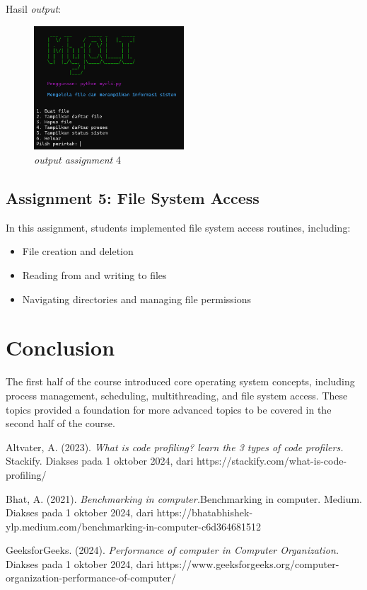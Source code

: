 \documentclass[12pt]{article}
\begin{document}
\par Hasil \textit{output}:
\begin{figure}[h]
    \centering
    \includegraphics[width=0.5\textwidth] {asset/output_assignment4_group2.png} 
    \caption{\textit{output assignment} 4}
    \label{fig:output_assignment_4}
\end{figure}

\subsection{Assignment 5: File System Access}
In this assignment, students implemented file system access routines, including:
\begin{itemize}
    \item File creation and deletion
    \item Reading from and writing to files
    \item Navigating directories and managing file permissions
\end{itemize}

\section{Conclusion}
The first half of the course introduced core operating system concepts, including process management, scheduling, multithreading, and file system access. These topics provided a foundation for more advanced topics to be covered in the second half of the course.

\begin{thebibliography}{3}
    Altvater, A. (2023). \textit{What is code profiling? learn the 3 types of code profilers.} Stackify. Diakses pada 1 oktober 2024, dari https://stackify.com/what-is-code-profiling/ 
    
    Bhat, A. (2021). \textit{Benchmarking in computer.}Benchmarking in computer. Medium. Diakses pada 1 oktober 2024, dari https://bhatabhishek-ylp.medium.com/benchmarking-in-computer-c6d364681512 

    GeeksforGeeks. (2024). \textit{Performance of computer in Computer Organization.} Diakses pada 1 oktober 2024, dari https://www.geeksforgeeks.org/computer-organization-performance-of-computer/ 
\end{thebibliography}
\end{document}
